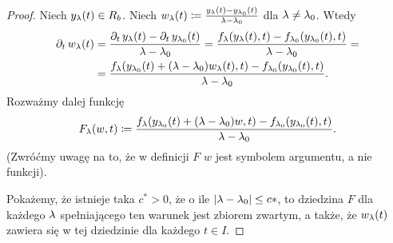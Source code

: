 \begin{proof}
	Niech $y_\l(t) \in R_b$. Niech $w_\l(t) \coloneqq \frac{ y_\l(t) - y_{\l_0}(t) }{ \l - \l_0 }$ dla $\l \ne \l_0$.
	Wtedy
%
	\begin{align*}
  	\pd{t} w_\l(t) &= \frac{ \pd{t} y_\l(t) - \pd{t} y_{\l_0}(t) }{ \l - \l_0 } = \frac{ f_\l(y_\l(t), t) - 
  		f_{\l_0}(y_{\l_0}(t), t) }{ \l - \l_0 } = \\
  	&=  \frac{ f_\l(y_{\l_0}(t) + (\l - \l_0)w_\l(t), t) - 
  		f_{\l_0}(y_{\l_0}(t), t) }{ \l - \l_0 } .
	\end{align*}
%
	Rozważmy dalej funkcję
%
	\begin{equation*}
	  F_\l(w, t) \coloneqq \frac{ f_\l(y_{\l_0}(t) + (\l - \l_0)w, t) -  f_{\l_0}(y_{\l_0}(t), t) }{ \l - \l_0 }.
	\end{equation*}
%
	(Zwróćmy uwagę na to, że w definicji $F$ $w$ jest symbolem argumentu, a nie funkcji).
	
	Pokażemy, że istnieje taka $c^* > 0$, że o ile $ \abs{ \l - \l_0} \le c*$, to dziedzina $F$ dla każdego $\l$ 
	spełniającego ten warunek jest zbiorem zwartym, a także, że $w_\l(t)$ zawiera się w tej dziedzinie dla każdego $t \in 
	I$. 
	

\end{proof}
